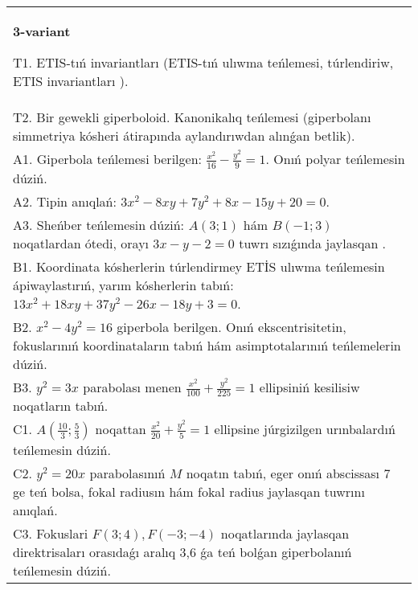 \documentclass{article}
\begin{document}
\begin{tabular}{m{17cm}}
\textbf{3-variant}
\newline

T1. ETIS-tıń invariantları (ETIS-tıń ulıwma teńlemesi, túrlendiriw, ETIS invariantları ).\\

T2. Bir gewekli giperboloid. Kanonikalıq teńlemesi (giperbolanı simmetriya kósheri átirapında aylandırıwdan alınǵan betlik).\\

A1. Giperbola teńlemesi berilgen: $\frac{x^{2}}{16}-\frac{y^{2}}{9}=1$. Onıń polyar teńlemesin dúziń.\\

A2. Tipin anıqlań: $3 x^{2}-8 xy+7 y^{2}+8 x-15 y+20=0$.\\

A3. Sheńber teńlemesin dúziń: $A (3;1) $ hám $B (-1;3) $ noqatlardan ótedi, orayı $3 x-y-2=0$ tuwrı sızıǵında jaylasqan .\\

B1. Koordinata kósherlerin túrlendirmey ETİS ulıwma teńlemesin ápiwaylastırıń, yarım kósherlerin tabıń: $13x^{2} + 18xy + 37y^{2} - 26x - 18y + 3 = 0$.  \\

B2. $x^{2} - 4y^{2} = 16$ giperbola berilgen. Onıń ekscentrisitetin, fokuslarınıń koordinataların tabıń hám asimptotalarınıń teńlemelerin dúziń.\\

B3. $y^{2} = 3x$ parabolası menen $\frac{x^{2}}{100} + \frac{y^{2}}{225} = 1$ ellipsiniń kesilisiw noqatların tabıń.  \\

C1. $A(\frac{10}{3};\frac{5}{3})$ noqattan $\frac{x^{2}}{20} + \frac{y^{2}}{5} = 1$ ellipsine júrgizilgen urınbalardıń teńlemesin dúziń.  \\

C2. $y^{2} = 20x$ parabolasınıń $M$ noqatın tabıń, eger onıń abscissası 7 ge teń bolsa, fokal radiusın hám fokal radius jaylasqan tuwrını anıqlań.\\

C3. Fokuslari $F(3;4), F(-3;-4)$ noqatlarında jaylasqan direktrisaları orasıdaǵı aralıq 3,6 ǵa teń bolǵan giperbolanıń teńlemesin dúziń.  \\

\end{tabular}
\vspace{1cm}
\end{document}
